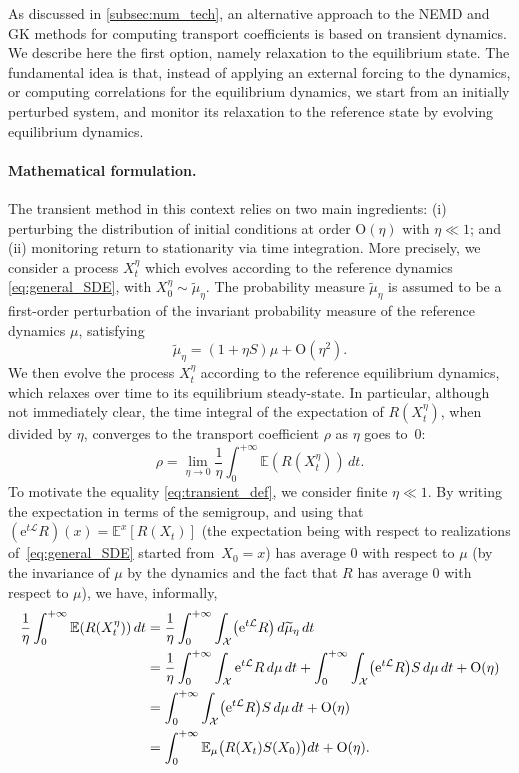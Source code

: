 \documentclass[11pt]{article}
\newcommand{\E}{\mathbb{E}}
\newcommand{\e}{\mathrm{e}}
\renewcommand{\L}{\mathcal{L}}
\newcommand{\bigO}{\mathrm{O}}
\theoremstyle{definition}
\let\oldparagraph=\paragraph
\renewcommand\paragraph[1]{\oldparagraph{#1.}}
\newcommand{\psip}{\widetilde{\mu}_\eta}
\begin{document}
As discussed in \cref{subsec:num_tech}, an alternative approach to the NEMD and GK methods for computing transport coefficients is based on transient dynamics. We describe here the first option, namely relaxation to the equilibrium state. The fundamental idea is that, instead of applying an external forcing to the dynamics, or computing correlations for the equilibrium dynamics, we start from an initially perturbed system, and monitor its relaxation to the reference state by evolving equilibrium dynamics.

\paragraph{Mathematical formulation} The transient method in this context relies on two main ingredients: (i) perturbing the distribution of initial conditions at order $\bigO(\eta)$ with $\eta\ll 1$; and (ii) monitoring return to stationarity via time integration. More precisely, we consider a process $X_t^\eta$ which evolves according to the reference dynamics \eqref{eq:general_SDE}, with $X_0^\eta \sim \psip$. The probability measure $\psip$ is assumed to be a first-order perturbation of the invariant probability measure of the reference dynamics $\mu$, satisfying
\begin{equation}
	\psip = (1+\eta S)\mu + \bigO(\eta^2).
	\label{eq:init_dist}
\end{equation}
We then evolve the process $X_t^\eta$ according to the reference equilibrium dynamics, which relaxes over time to its equilibrium steady-state. In particular, although not immediately clear, the time integral of the expectation of $R(X_t^\eta)$, when divided by $\eta$, converges to the transport coefficient $\rho$ as $\eta$ goes to~$0$:
\begin{equation}
	\rho = \lim_{\eta\to 0} \frac{1}{\eta}\int_0^{+\infty} \E(R(X_t^\eta)) \, dt.
	\label{eq:transient_def}
\end{equation}
To motivate the equality \eqref{eq:transient_def}, we consider finite $\eta\ll 1$. By writing the expectation in terms of the semigroup, and using that $(\e^{t\L}R)(x) = \E^x[R(X_t)]$ (the expectation being with respect to realizations of~\eqref{eq:general_SDE} started from~$X_0=x$) has average 0 with respect to $\mu$ (by the invariance of $\mu$ by the dynamics and the fact that $R$ has average 0 with respect to $\mu$), we have, informally,
\begin{align}
    \label{eq:gk_equiv1}
	\frac{1}{\eta}\int_0^{+\infty} \E(R(X_t^\eta)) \, dt &= \frac{1}{\eta} \int_0^{+\infty} \int_\mathcal{X} \bigl(\e^{t\L} R\bigr) \, d\psip \, dt \\
	\notag
	&= \frac{1}{\eta}\int_0^{+\infty} \int_\mathcal{X} \e^{t\L} R \, d\mu \, dt + \int_0^{+\infty} \int_\mathcal{X} \bigl(\e^{t\L} R\bigr) S \, d\mu \, dt + \bigO(\eta) \\
	\notag
	&= \int_0^{+\infty} \int_\mathcal{X} \bigl(\e^{t\L} R\bigr) S \, d\mu \, dt + \bigO(\eta) \\
	&= \int_0^{+\infty} \E_\mu\bigl(R(X_t)S(X_0)\bigr) dt + \bigO(\eta).
    \label{eq:gk_equiv2}
\end{align}
\end{document}
